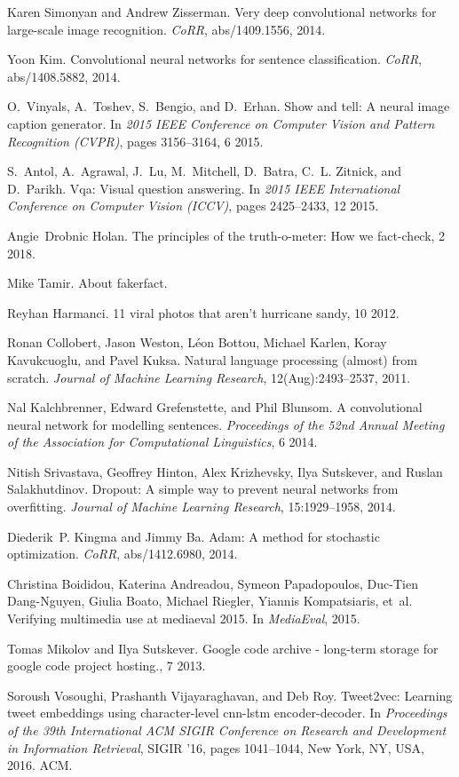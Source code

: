 \begin{thebibliography}{10}
Karen Simonyan and Andrew Zisserman.
 Very deep convolutional networks for large-scale image recognition.
 {\em CoRR}, abs/1409.1556, 2014.

Yoon Kim.
 Convolutional neural networks for sentence classification.
 {\em CoRR}, abs/1408.5882, 2014.

O.~Vinyals, A.~Toshev, S.~Bengio, and D.~Erhan.
 Show and tell: A neural image caption generator.
 In {\em 2015 IEEE Conference on Computer Vision and Pattern
  Recognition (CVPR)}, pages 3156--3164, 6 2015.

S.~Antol, A.~Agrawal, J.~Lu, M.~Mitchell, D.~Batra, C.~L. Zitnick, and
  D.~Parikh.
 Vqa: Visual question answering.
 In {\em 2015 IEEE International Conference on Computer Vision
  (ICCV)}, pages 2425--2433, 12 2015.

Angie~Drobnic Holan.
 The principles of the truth-o-meter: How we fact-check, 2 2018.

Mike Tamir.
 About fakerfact.

Reyhan Harmanci.
 11 viral photos that aren't hurricane sandy, 10 2012.

Ronan Collobert, Jason Weston, L{\'e}on Bottou, Michael Karlen, Koray
  Kavukcuoglu, and Pavel Kuksa.
 Natural language processing (almost) from scratch.
 {\em Journal of Machine Learning Research}, 12(Aug):2493--2537, 2011.

Nal Kalchbrenner, Edward Grefenstette, and Phil Blunsom.
 A convolutional neural network for modelling sentences.
 {\em Proceedings of the 52nd Annual Meeting of the Association for
  Computational Linguistics}, 6 2014.

Nitish Srivastava, Geoffrey Hinton, Alex Krizhevsky, Ilya Sutskever, and Ruslan
  Salakhutdinov.
 Dropout: A simple way to prevent neural networks from overfitting.
 {\em Journal of Machine Learning Research}, 15:1929--1958, 2014.

Diederik~P. Kingma and Jimmy Ba.
 Adam: {A} method for stochastic optimization.
 {\em CoRR}, abs/1412.6980, 2014.

Christina Boididou, Katerina Andreadou, Symeon Papadopoulos, Duc-Tien
  Dang-Nguyen, Giulia Boato, Michael Riegler, Yiannis Kompatsiaris, et~al.
 Verifying multimedia use at mediaeval 2015.
 In {\em MediaEval}, 2015.

Tomas Mikolov and Ilya Sutskever.
 Google code archive - long-term storage for google code project
  hosting., 7 2013.

Soroush Vosoughi, Prashanth Vijayaraghavan, and Deb Roy.
 Tweet2vec: Learning tweet embeddings using character-level cnn-lstm
  encoder-decoder.
 In {\em Proceedings of the 39th International ACM SIGIR Conference on
  Research and Development in Information Retrieval}, SIGIR '16, pages
  1041--1044, New York, NY, USA, 2016. ACM.

\end{thebibliography}
